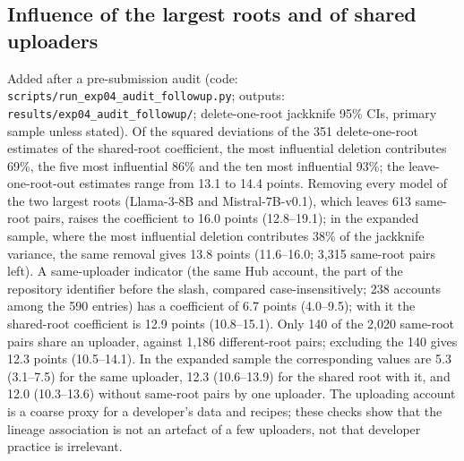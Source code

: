 \documentclass[10pt]{article}
\begin{document}
\begin{table}[H]
\caption{\textbf{Within-root dose-response and per-root pooling} (primary sample; post hoc). Within-root rows: delete-one-root jackknife 95\% CIs over the roots contributing same-root pairs. Random-effects pooling uses DerSimonian--Laird weights with model-level dyadic SEs and is restricted to roots with at least 10 same-root pairs, because a root with a single same-root pair fits it exactly and has no usable SE. Unweighted mean: SE from the spread across roots.}
\label{tab:r3dose}
\centering
\footnotesize
{}
\end{table}

\subsection*{Influence of the largest roots and of shared uploaders}
Added after a pre-submission audit (code: \texttt{scripts/run\_exp04\_audit\_followup.py}; outputs: \texttt{results/exp04\_audit\_followup/}; delete-one-root jackknife 95\% CIs, primary sample unless stated). Of the squared deviations of the 351 delete-one-root estimates of the shared-root coefficient, the most influential deletion contributes 69\%, the five most influential 86\% and the ten most influential 93\%; the leave-one-root-out estimates range from 13.1 to 14.4 points. Removing every model of the two largest roots (Llama-3-8B and Mistral-7B-v0.1), which leaves 613 same-root pairs, raises the coefficient to 16.0 points (12.8--19.1); in the expanded sample, where the most influential deletion contributes 38\% of the jackknife variance, the same removal gives 13.8 points (11.6--16.0; 3{,}315 same-root pairs left). A same-uploader indicator (the same Hub account, the part of the repository identifier before the slash, compared case-insensitively; 238 accounts among the 590 entries) has a coefficient of 6.7 points (4.0--9.5); with it the shared-root coefficient is 12.9 points (10.8--15.1). Only 140 of the 2{,}020 same-root pairs share an uploader, against 1{,}186 different-root pairs; excluding the 140 gives 12.3 points (10.5--14.1). In the expanded sample the corresponding values are 5.3 (3.1--7.5) for the same uploader, 12.3 (10.6--13.9) for the shared root with it, and 12.0 (10.3--13.6) without same-root pairs by one uploader. The uploading account is a coarse proxy for a developer's data and recipes; these checks show that the lineage association is not an artefact of a few uploaders, not that developer practice is irrelevant.
\end{document}
